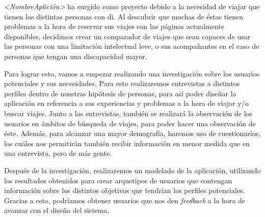 
\textit{<NombreAplición>} ha surgido como proyecto debido a la necesidad de viajar que tienen las distintas personas con \gls{di}. Al
descubrir que muchas de éstas tienen problemas a la hora de reservar sus viajes con las páginas actualmente disponibles, decidimos crear un 
comparador de viajes que sean capaces de usar las personas con una limitación intelectual leve, o sus acompañantes en el caso de personas que
tengan una discapacidad mayor. 

Para lograr esto, vamos a empezar realizando una investigación sobre los usuarios potenciales y sus necesidades. Para esto realizaremos entrevistas
a distintos perfiles dentro de nuestras hipótesis de personas, para así poder diseñar la aplicación en referencia a sus experiencias y problemas a la hora
de viajar y/o buscar viajes. Junto a las entrevistas, también se realizará la observación de los usuarios en ámbitos de búsqueda de viajes, para poder hacer
una observación de éste. Además, para alcanzar una mayor demografía, haremos uso de cuestionarios, los cuáles nos permitirán también recibir información
en menor medida que en una entrevista, pero de más gente.

Después de la investigación, realizaremos un modelado de la aplicación, utilizando los resultados obtenidos para crear arquetipos de usuarios que
contengan información sobre los distintos objetivos que tendrían los perfiles potenciales. Gracias a esto, podríamos obtener usuarios que nos den
\textit{feedback} a la hora de avanzar con el diseño del sistema.
